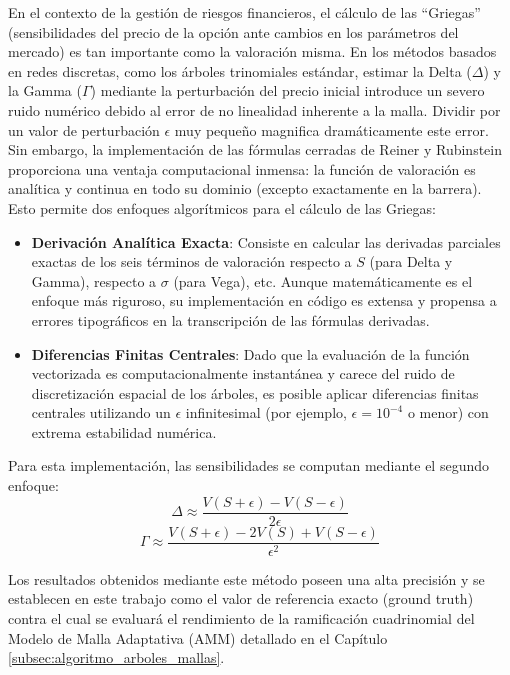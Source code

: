 En el contexto de la gestión de riesgos financieros, el cálculo de las ``Griegas'' (sensibilidades del precio de la opción ante cambios en los parámetros del mercado) es tan importante como la valoración misma. En los métodos basados en redes discretas, como los árboles trinomiales estándar, estimar la Delta ($\Delta$) y la Gamma ($\Gamma$) mediante la perturbación del precio inicial introduce un severo ruido numérico debido al error de no linealidad inherente a la malla. Dividir por un valor de perturbación $\epsilon$ muy pequeño magnifica dramáticamente este error.
Sin embargo, la implementación de las fórmulas cerradas de Reiner y Rubinstein proporciona una ventaja computacional inmensa: la función de valoración es analítica y continua en todo su dominio (excepto exactamente en la barrera). Esto permite dos enfoques algorítmicos para el cálculo de las Griegas:
\begin{itemize}
  \item \textbf{Derivación Analítica Exacta}: Consiste en calcular las derivadas parciales exactas de los seis términos de valoración respecto a $S$ (para Delta y Gamma), respecto a $\sigma$ (para Vega), etc. Aunque matemáticamente es el enfoque más riguroso, su implementación en código es extensa y propensa a errores tipográficos en la transcripción de las fórmulas derivadas.

  \item \textbf{Diferencias Finitas Centrales}: Dado que la evaluación de la función vectorizada es computacionalmente instantánea y carece del ruido de discretización espacial de los árboles, es posible aplicar diferencias finitas centrales utilizando un $\epsilon$ infinitesimal (por ejemplo, $\epsilon=10^{-4}$ o menor) con extrema estabilidad numérica.
\end{itemize}

Para esta implementación, las sensibilidades se computan mediante el segundo enfoque: 
\begin{equation*}
  \Delta \approx \frac{V(S+\epsilon) - V(S-\epsilon)}{2\epsilon} 
\end{equation*}
\begin{equation*}
  \Gamma \approx \frac{V(S+\epsilon) - 2V(S) + V(S-\epsilon)}{\epsilon^2}
\end{equation*}

Los resultados obtenidos mediante este método poseen una alta precisión y se establecen en este trabajo como el valor de referencia exacto (ground truth) contra el cual se evaluará el rendimiento de la ramificación cuadrinomial del Modelo de Malla Adaptativa (AMM) detallado en el Capítulo \ref{subsec:algoritmo_arboles_mallas}.

